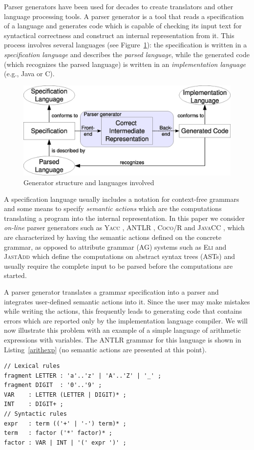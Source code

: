 \documentclass{informat} %
\newcommand{\lstref}[1]{Listing~\ref{#1}}
\newcommand{\figref}[1]{Figure~\ref{#1}}
\newcommand{\tool}[1]{\textsc{#1}}
\begin{document}
Parser generators have been used for decades to create translators and other language processing tools.
A parser generator is a tool that reads a specification of a language and generates code which is capable of checking its input text for syntactical correctness and construct an internal representation from it. This process involves several languages (see \figref{languages}): the specification is written in a \emph{specification language} and describes the \emph{parsed language}, while the generated code (which recognizes the parsed language) is written in an \emph{implementation language} (e.g., Java or C). 

\begin{figure}[h!]
		\centering
		\includegraphics[width=.8\textwidth]{languages}
		\caption{Generator structure and languages involved}\label{languages}
\end{figure}

A specification language usually includes a notation for context-free grammars and some means to specify \emph{semantic actions} which are the computations translating a program into the internal representation. In this paper we consider \emph{on-line} parser generators such as \tool{Yacc} \cite{YACC}, \tool{ANTLR} \cite{ANTLR}, \tool{Coco/R} \cite{Coco/R} and \tool{JavaCC} \cite{JavaCC}, which are characterized by having the semantic actions defined on the concrete grammar, as opposed to attribute grammar (AG) systems such as \tool{Eli} \cite{Eli} and \tool{JastAdd} \cite{JastAdd} which define the computations on abstract syntax trees (ASTs) and usually require the complete input to be parsed before the computations are started. 

A parser generator translates a grammar specification into a parser and integrates user-defined semantic actions into it.
Since the user may make mistakes while writing the actions, this frequently leads to generating code that contains errors which are reported only by the implementation language compiler. We will now illustrate this problem with an example of a simple language of arithmetic expressions with variables. The \tool{ANTLR} grammar for this language is shown in \lstref{arithexp} (no semantic actions are presented at this point). 
\begin{lstlisting}[label=arithexp,caption=An ANTLR grammar for arithmetic expressions]
// Lexical rules
fragment LETTER : 'a'..'z' | 'A'..'Z' | '_' ;
fragment DIGIT  : '0'..'9' ;
VAR    : LETTER (LETTER | DIGIT)* ;
INT    : DIGIT+ ;
// Syntactic rules
expr   : term (('+' | '-') term)* ;
term   : factor ('*' factor)* ;
factor : VAR | INT | '(' expr ')' ;
\end{lstlisting}
\end{document}
